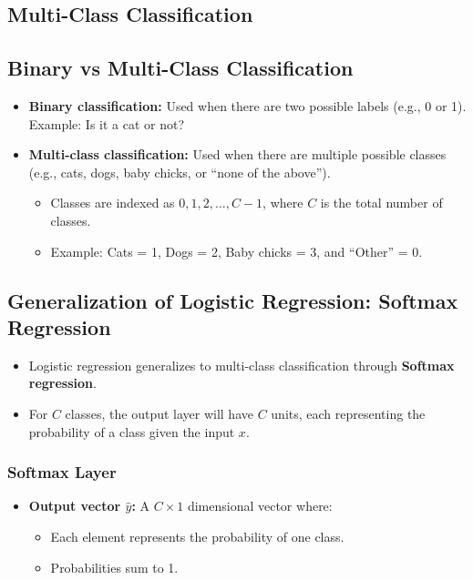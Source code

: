 \documentclass[letterpaper,12pt,notitlepage,twoside]{report}
\begin{document}
\subsection{Multi-Class Classification}
\subsection*{Binary vs Multi-Class Classification}
\begin{itemize}[noitemsep, topsep=0pt]
    \item \textbf{Binary classification:} Used when there are two possible labels (e.g., 0 or 1). Example: Is it a cat or not?
    \item \textbf{Multi-class classification:} Used when there are multiple possible classes (e.g., cats, dogs, baby chicks, or ``none of the above'').
    \begin{itemize}
        \item Classes are indexed as $0, 1, 2, \ldots, C-1$, where $C$ is the total number of classes.
        \item Example: Cats = 1, Dogs = 2, Baby chicks = 3, and ``Other'' = 0.
    \end{itemize}
\end{itemize}

\subsection*{Generalization of Logistic Regression: Softmax Regression}
\begin{itemize}[noitemsep, topsep=0pt]
    \item Logistic regression generalizes to multi-class classification through \textbf{Softmax regression}.
    \item For $C$ classes, the output layer will have $C$ units, each representing the probability of a class given the input $x$.
\end{itemize}

\newpage
\subsubsection{Softmax Layer}
\begin{itemize}[noitemsep, topsep=0pt]
    \item \textbf{Output vector $\hat{y}$:} A $C \times 1$ dimensional vector where:
    \begin{itemize}
        \item Each element represents the probability of one class.
        \item Probabilities sum to 1.
    \end{itemize}
\end{itemize}
\end{document}
